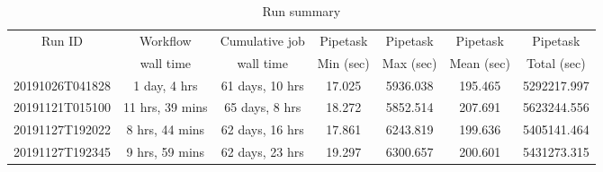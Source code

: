 \begin{longtable} {|c|c|c|c|c|c|c|}
\caption{Run summary \label{tab:runSummary}}\\
\hline
\multirow{2}{*}{Run ID} & Workflow & Cumulative job & Pipetask & Pipetask & Pipetask & Pipetask \\
                        & wall time & wall time     & Min (sec) & Max (sec) & Mean (sec) & Total (sec)\\
\hline
20191026T041828 & 1 day, 4 hrs    & 61 days, 10 hrs & 17.025 & 5936.038 & 195.465 & 5292217.997 \\
20191121T015100 & 11 hrs, 39 mins & 65 days, 8 hrs  & 18.272 & 5852.514 & 207.691 & 5623244.556 \\
20191127T192022 & 8 hrs, 44 mins  & 62 days, 16 hrs & 17.861 & 6243.819 & 199.636 & 5405141.464 \\
20191127T192345 & 9 hrs, 59 mins  & 62 days, 23 hrs & 19.297 & 6300.657 & 200.601 & 5431273.315 \\ \hline
\end{longtable}
